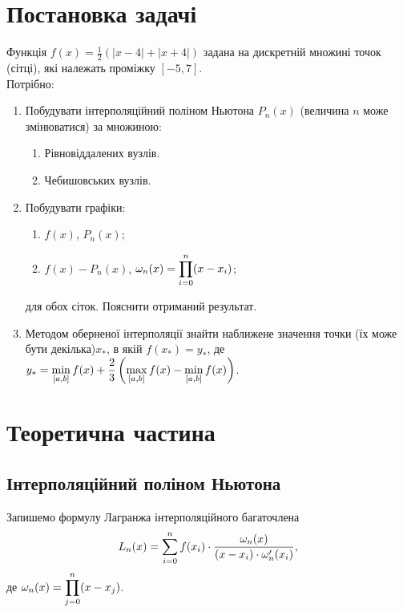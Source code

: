 




\section{Постановка задачі}

Функція $f(x) = \frac12(|x-4|+|x+4|)$ задана на дискретній множині точок (сітці), які належать проміжку $[-5,7]$. \\

Потрібно:
\begin{enumerate}
	\item Побудувати інтерполяційний поліном Ньютона $P_n (x)$ (величина $n$ може змінюватися) за множиною:
	\begin{enumerate}
		\item Рівновіддалених вузлів.
		\item Чебишовських вузлів.
	\end{enumerate}
	\item Побудувати графіки:
	\begin{enumerate}
		\item $f(x)$, $P_n(x)$;
		\item $f(x)-P_n (x)$, $\omega_n (x)= \displaystyle\prod\limits_{i=0}^n (x-x_i)$;
	\end{enumerate}
	для обох сіток. Пояснити отриманий результат.
	\item Методом оберненої інтерполяції знайти наближене значення точки (їх може бути декілька)$x_*$, в якій $f(x_*)=y_*$, де $y_*=\displaystyle\min\limits_{[a,b]}f(x)+\frac23\left(\displaystyle\max\limits_{[a,b]}f(x)-\displaystyle\min\limits_{[a,b]}f(x)\right)$.
\end{enumerate}

\section{Теоретична частина}

\subsection{Інтерполяційний поліном Ньютона}

Запишемо формулу Лагранжа інтерполяційного багаточлена
\begin{equation}
    \label{eq:6.15}
    L_n(x) = \displaystyle\sum\limits_{i=0}^n f(x_i) \cdot \dfrac{\omega_n(x)}{(x-x_i)\cdot \omega_n'(x_i)},
\end{equation}
де $\omega_n(x) = \displaystyle\prod\limits_{j=0}^n (x-x_j)$. \\

